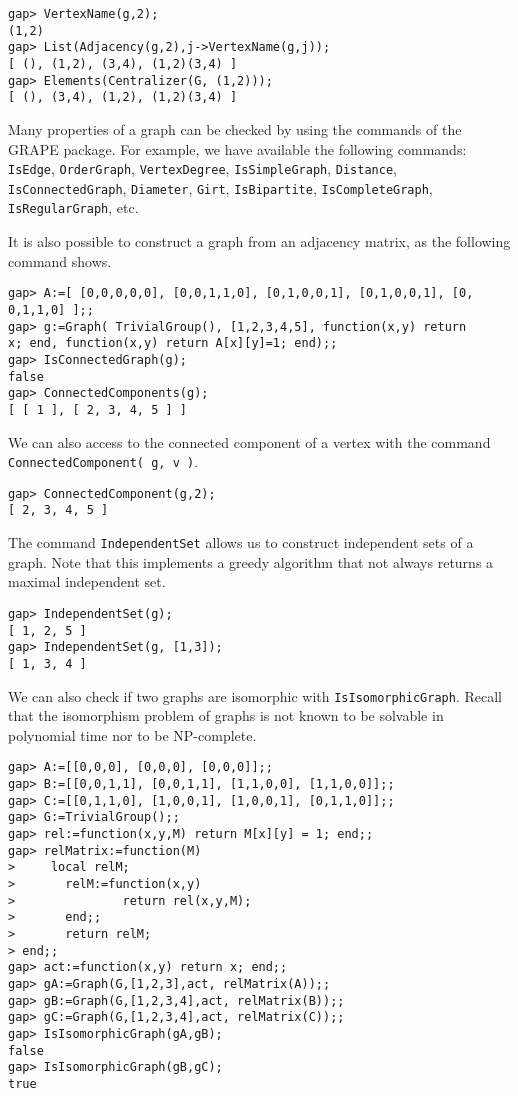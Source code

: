 \begin{lstlisting}
gap> VertexName(g,2);
(1,2)
gap> List(Adjacency(g,2),j->VertexName(g,j));
[ (), (1,2), (3,4), (1,2)(3,4) ]
gap> Elements(Centralizer(G, (1,2)));
[ (), (3,4), (1,2), (1,2)(3,4) ]
\end{lstlisting}

Many properties of a graph can be checked by using the commands of the GRAPE package.
For example, we have available the following commands: \lstinline{IsEdge}, \lstinline{OrderGraph}, \lstinline{VertexDegree}, \lstinline{IsSimpleGraph},  \lstinline{Distance}, \lstinline{IsConnectedGraph},
 \lstinline{Diameter}, \lstinline{Girt},
 \lstinline{IsBipartite}, \lstinline{IsCompleteGraph}, \lstinline{IsRegularGraph}, etc. %


It is also possible to construct a graph from an adjacency matrix, as the following command shows.

\begin{lstlisting}
gap> A:=[ [0,0,0,0,0], [0,0,1,1,0], [0,1,0,0,1], [0,1,0,0,1], [0,
0,1,1,0] ];;
gap> g:=Graph( TrivialGroup(), [1,2,3,4,5], function(x,y) return 
x; end, function(x,y) return A[x][y]=1; end);;
gap> IsConnectedGraph(g);
false
gap> ConnectedComponents(g);
[ [ 1 ], [ 2, 3, 4, 5 ] ]
\end{lstlisting}

We can also access to the connected component of a vertex with the command \lstinline{ConnectedComponent( g, v )}.

\begin{lstlisting}
gap> ConnectedComponent(g,2);
[ 2, 3, 4, 5 ]
\end{lstlisting}

The command \lstinline{IndependentSet} allows us to construct independent sets of a graph.
Note that this implements a greedy algorithm that not always returns a maximal independent set.

\begin{lstlisting}
gap> IndependentSet(g);
[ 1, 2, 5 ]
gap> IndependentSet(g, [1,3]);
[ 1, 3, 4 ]
\end{lstlisting}

We can also check if two graphs are isomorphic with \lstinline{IsIsomorphicGraph}.
Recall that the isomorphism problem of graphs is not known to be solvable in polynomial time nor to be NP-complete.

\begin{lstlisting}
gap> A:=[[0,0,0], [0,0,0], [0,0,0]];;
gap> B:=[[0,0,1,1], [0,0,1,1], [1,1,0,0], [1,1,0,0]];;
gap> C:=[[0,1,1,0], [1,0,0,1], [1,0,0,1], [0,1,1,0]];;
gap> G:=TrivialGroup();;
gap> rel:=function(x,y,M) return M[x][y] = 1; end;;
gap> relMatrix:=function(M)
>     local relM;
>       relM:=function(x,y)
>               return rel(x,y,M);
>       end;;
>       return relM;
> end;;
gap> act:=function(x,y) return x; end;;
gap> gA:=Graph(G,[1,2,3],act, relMatrix(A));;
gap> gB:=Graph(G,[1,2,3,4],act, relMatrix(B));;
gap> gC:=Graph(G,[1,2,3,4],act, relMatrix(C));;
gap> IsIsomorphicGraph(gA,gB);
false
gap> IsIsomorphicGraph(gB,gC);
true
\end{lstlisting}

